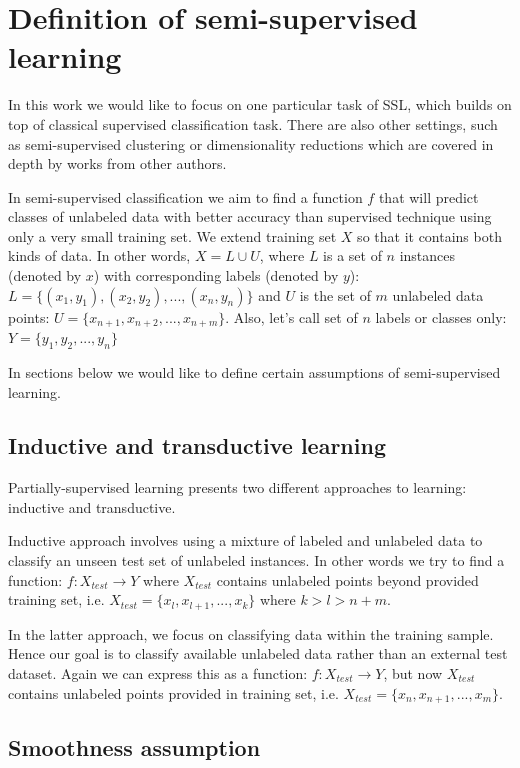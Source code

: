 \documentclass[12pt, a4paper, pdflatex]{report}
\begin{document}
\section{Definition of semi-supervised learning}
In this work we would like to focus on one particular task of SSL, which builds on top of classical supervised classification task. There are also other settings, such as semi-supervised clustering or dimensionality reductions which are covered in depth by works from other authors.

In semi-supervised classification we aim to find a function $ f $ that will predict classes of unlabeled data with better accuracy than supervised technique using only a very small training set. We extend training set $ X $ so that it contains both kinds of data. In other words, $ X = L \cup U $, where $ L $ is a set of $ n $ instances (denoted by $ x $) with corresponding labels (denoted by $ y $): $ L = \{ (x_1, y_1), (x_2, y_2), ..., (x_n, y_n)\} $ and $ U $ is the set of $ m $ unlabeled data points: $ U = \{ x_{n+1}, x_{n+2}, ..., x_{n+m}\} $. Also, let's call set of $n$ labels or classes only: $ Y = \{ y_1, y_2, ..., y_n \} $

In sections below we would like to define certain assumptions of semi-supervised learning.

\subsection{Inductive and transductive learning}
Partially-supervised learning presents two different approaches to learning: inductive and transductive\cite{chapelle06}. 

Inductive approach involves using a mixture of labeled and unlabeled data to classify an unseen test set of unlabeled instances. In other words we try to find a function: $ f: X_{test} \to Y $ where $ X_{test} $ contains unlabeled points beyond provided training set, i.e. $ X_{test} = \{ x_l, x_{l+1}, ..., x_{k} \} $ where $ k > l > n+m $.

In the latter approach, we focus on classifying data within the training sample. Hence our goal is to classify available unlabeled data rather than an external test dataset. Again we can express this as a function: $ f: X_{test} \to Y $, but now $ X_{test} $ contains unlabeled points provided in training set, i.e. $ X_{test} = \{ x_n, x_{n+1}, ..., x_{m} \} $.
\subsection{Smoothness assumption}
\end{document}
